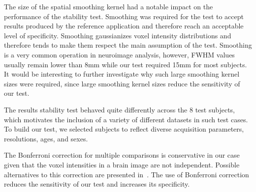 \documentclass[lettersize,journal]{IEEEtran}
\begin{document}
The size of the spatial smoothing kernel had a notable impact on the performance of the stability test. Smoothing was required for the test to accept results produced by the reference application and therefore reach an acceptable level of specificity. Smoothing gaussianizes voxel intensity distributions and therefore tends to make them respect the main assumption of the test. Smoothing is a very common operation in neuroimage analysis, however, FWHM values usually remain lower than 8mm while our test required 15mm for most subjects. It would be interesting to further investigate why such large smoothing kernel sizes were required, since large smoothing kernel sizes reduce the sensitivity of our test. 

The results stability test behaved quite differently across the 8 test subjects, which motivates the inclusion 
of a variety of different datasets in such test cases. To build our test, we selected subjects to reflect diverse acquisition parameters, resolutions, ages, and sexes.


The Bonferroni correction for multiple comparisons is conservative in our case given that the voxel intensities in a brain image are not independent. 
Possible alternatives to this correction are presented in~\cite{NICHOLS2007246}. The use of Bonferroni correction reduces the sensitivity of our test 
and increases its specificity. 
\end{document}

